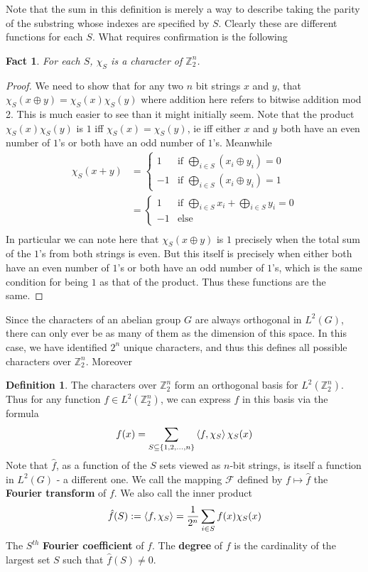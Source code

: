 \documentclass{article}
\theoremstyle{definition}
\newtheorem{definition}{Definition}[section]
\theoremstyle{plain}
\theoremstyle{theorem}
\newtheorem{fact}{Fact}[section]
\begin{document}
Note that the sum in this definition is merely a way to describe taking the parity of the substring whose indexes are specified by $S$. Clearly these are different functions for each $S$. What requires confirmation is the following
\begin{fact}
	For each $S$, $\chi_S$ is a character of $\mathbb{Z}_2^n$.
\end{fact}
\begin{proof}
	We need to show that for any two $n$ bit strings $x$ and $y$, that $\chi_S(x \oplus y) = \chi_S(x)\chi_S(y)$ where addition here refers to bitwise addition mod 2. This is much easier to see than it might initially seem. Note that the product $\chi_S(x)\chi_S(y)$ is $1$ iff $\chi_S(x) = \chi_S(y)$, ie iff either $x$ and $y$ both have an even number of $1$'s or both have an odd number of $1$'s. Meanwhile 
\begin{align} 
	\chi_S(x+y) &= \begin{cases} 1 & \textrm{if } \bigoplus_{i \in S} (x_i \oplus y_i) = 0  \\
	-1 & \textrm{if } \bigoplus_{i \in S} (x_i \oplus y_i) = 1  \end{cases} \\
	&= \begin{cases} 1 & \textrm{if } \bigoplus_{i \in S} x_i + \bigoplus_{i \in S} y_i = 0 \\
	-1 & \textrm{else} \end{cases} \\
\end{align}
In particular we can note here that $\chi_S(x \oplus y)$ is $1$ precisely when the total sum of the $1$'s from both strings is even. But this itself is precisely when either both have an even number of $1$'s or both have an odd number of $1$'s, which is the same condition for being $1$ as that of the product. Thus these functions are the same. 
\end{proof}
Since the characters of an abelian group $G$ are always orthogonal in $L^2(G)$, there can only ever be as many of them as the dimension of this space. In this case, we have identified $2^n$ unique characters, and thus this defines all possible characters over $\mathbb{Z}_2^n$. Moreover
\begin{definition}
	The characters over $\mathbb{Z}_2^n$ form an orthogonal basis for $L^2(\mathbb{Z}_2^n)$. Thus for any function $f \in L^2(\mathbb{Z}_2^n)$, we can express $f$ in this basis via the formula
	\[ f(x) = \sum_{S \subseteq \{1,2,\ldots,n\}} \braket{f,\chi_S} \chi_S(x) \]
Note that $\hat{f}$, as a function of the $S$ sets viewed as $n$-bit strings, is itself a function in $L^2(G)$ - a different one. We call the mapping $\mathcal{F}$ defined by $f \mapsto \hat{f}$ the \textbf{Fourier transform} of $f$. We also call the inner product 
\[ \hat{f}(S) := \braket{f,\chi_S} = \frac{1}{2^n}\sum_{i \in S} f(x)\chi_S(x) \]
 The $S^{th}$ \textbf{Fourier coefficient} of $f$. The \textbf{degree} of $f$ is the cardinality of the largest set $S$ such that $\hat{f}(S) \neq 0$. 
\end{definition}
\end{document}
